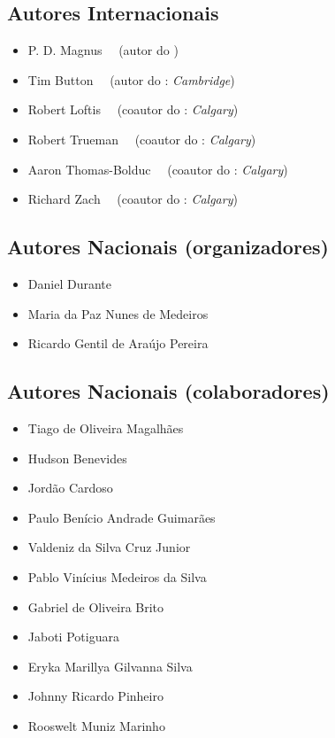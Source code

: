 {\small \subsection{Autores Internacionais}
\begin{itemize}
	\item P. D. Magnus \ \  (autor do \forallx)
	\item Tim Button \ \ (autor do \forallx: \textit{Cambridge})
	\item Robert Loftis \ \ (coautor do \forallx: \textit{Calgary})
	\item Robert Trueman \ \ (coautor do \forallx: \textit{Calgary})
	\item Aaron Thomas-Bolduc \ \ (coautor do \forallx: \textit{Calgary})
	\item Richard Zach \ \ (coautor do \forallx: \textit{Calgary})
\end{itemize}
  
\subsection{Autores Nacionais (organizadores)}
\begin{itemize}
	\item Daniel Durante 
	\item Maria da Paz Nunes de Medeiros
	\item Ricardo Gentil de Araújo Pereira
\end{itemize}

\subsection{Autores Nacionais (colaboradores)}
\begin{itemize}
	\item Tiago de Oliveira Magalhães
	\item Hudson Benevides
	\item Jordão Cardoso
	\item Paulo Benício Andrade Guimarães
	\item Valdeniz da Silva Cruz Junior
	\item Pablo Vinícius Medeiros da Silva
	\item Gabriel de Oliveira Brito
	\item Jaboti Potiguara
	\item Eryka Marillya Gilvanna Silva
	\item Johnny Ricardo Pinheiro
	\item Rooswelt Muniz Marinho
\end{itemize}}

